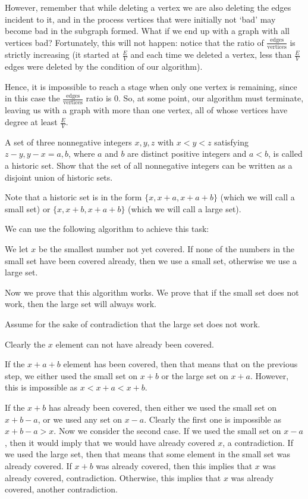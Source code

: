However, remember that while deleting a vertex we are also deleting the edges incident to it, and in the process vertices that were initially not ‘bad’ may become bad in the subgraph formed. What if we end up with a graph with all vertices bad? Fortunately, this will not happen: notice that the ratio of $\frac{\text{edges}}{\text{vertices}}$ is strictly increasing (it started at $\frac{E}{V}$ and each time we deleted a vertex, less than $\frac{E}{V}$ edges were deleted by the condition of our algorithm). 

Hence, it is impossible to reach a stage when only one vertex is remaining, since in this case the $\frac{\text{edges}}{\text{vertices}}$ ratio is 0. So, at some point, our algorithm must terminate, leaving us with a graph with more than one vertex, all of whose vertices have degree at least $\frac{E}{V}$. 

\begin{example} [ISL 2001]
    A set of three nonnegative integers ${x, y, z}$ with $x<y<z$ satisfying ${z-y, y-x} = {a, b}$, where $a$ and $b$ are distinct positive integers and $a < b$, is called a historic set. Show that the set of all nonnegative integers can be written as a disjoint union of historic sets. 
\end{example}

\sol Note that a historic set is in the form $\{x, x+a, x+a+b\}$ (which we will call a small set) or $\{x, x+b, x+a+b\}$ (which we will call a large set).

We can use the following algorithm to achieve this task:

We let $x$ be the smallest number not yet covered. If none of the numbers in the small set have been covered already, then we use a small set, otherwise we use a large set.

Now we prove that this algorithm works. We prove that if the small set does not work, then the large set will always work.

Assume for the sake of contradiction that the large set does not work.

Clearly the $x$ element can not have already been covered.

If the $x+a+b$ element has been covered, then that means that on the previous step, we either used the small set on $x+b$ or the large set on $x+a$. However, this is impossible as $x < x+a < x+b$.

If the $x+b$ has already been covered, then either we used the small set on $x+b-a$, or we used any set on $x-a$. Clearly the first one is impossible as $x+b-a>x$. Now we consider the second case. If we used the small set on $x-a$, then it would imply that we would have already covered $x$, a contradiction. If we used the large set, then that means that some element in the small set was already covered. If $x+b$ was already covered, then this implies that $x$ was already covered, contradiction. Otherwise, this implies that $x$ was already covered, another contradiction.

